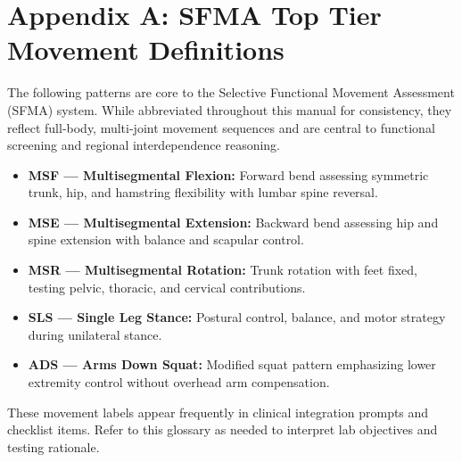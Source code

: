 \section*{Appendix A: SFMA Top Tier Movement Definitions}

The following patterns are core to the Selective Functional Movement Assessment (SFMA) system. While abbreviated throughout this manual for consistency, they reflect full-body, multi-joint movement sequences and are central to functional screening and regional interdependence reasoning.

\begin{itemize}
  \item \textbf{MSF — Multisegmental Flexion:} Forward bend assessing symmetric trunk, hip, and hamstring flexibility with lumbar spine reversal.
  \item \textbf{MSE — Multisegmental Extension:} Backward bend assessing hip and spine extension with balance and scapular control.
  \item \textbf{MSR — Multisegmental Rotation:} Trunk rotation with feet fixed, testing pelvic, thoracic, and cervical contributions.
  \item \textbf{SLS — Single Leg Stance:} Postural control, balance, and motor strategy during unilateral stance.
  \item \textbf{ADS — Arms Down Squat:} Modified squat pattern emphasizing lower extremity control without overhead arm compensation.
\end{itemize}

\noindent
These movement labels appear frequently in clinical integration prompts and checklist items. Refer to this glossary as needed to interpret lab objectives and testing rationale.